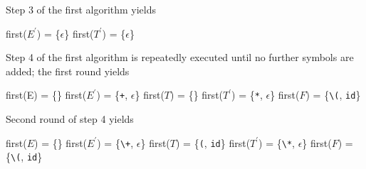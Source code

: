 \documentclass[8pt,a4paper,compress,handout]{beamer}
\newcommand{\mm}[1]{$#1$}
\newcommand{\expo}[2]{$#1^{#2}$}
\newenvironment{spaced}
{
\smallskip
\hspace{.5cm}
\begin{minipage}[c]{\textwidth}
}
{
\end{minipage}
\smallskip
}
\begin{document}
\begin{frame}[fragile]
\pause

Step 3 of the first algorithm yields

\text{ }
\begin{spaced}
\begin{production}
first(\expo{E}{\prime}) = \{\mm{\epsilon}\}
first(\expo{T}{\prime}) = \{\mm{\epsilon}\}
\end{production}
\end{spaced}

\pause

Step 4 of the first algorithm is repeatedly executed until no further symbols are added; the first round yields

\text{ }
\begin{spaced}
\begin{production}
first(E)  = \{\}
first(\expo{E}{\prime}) = \{\lstinline{+}, \mm{\epsilon}\}
first(\mm{T})  = \{\}
first(\expo{T}{\prime}) = \{\lstinline{*}, \mm{\epsilon}\}
first(\mm{F})  = \{\lstinline{\(}, \lstinline{id}\}
\end{production}
\end{spaced}

\pause

Second round of step 4 yields

\text{ }
\begin{spaced}
\begin{production}
first(\mm{E})  = \{\}
first(\expo{E}{\prime}) = \{\lstinline{\+}, \mm{\epsilon}\}
first(\mm{T})  = \{\lstinline{(}, \lstinline{id}\}
first(\expo{T}{\prime}) = \{\lstinline{\*}, \mm{\epsilon}\}
first(\mm{F})  = \{\lstinline{\(}, \lstinline{id}\}
\end{production}
\end{spaced}
\end{frame}
\end{document}

